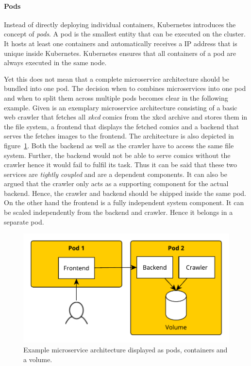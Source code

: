\paragraph{Pods}%
\label{par:Pods}
Instead of directly deploying individual containers, Kubernetes introduces the
concept of \textit{pods}. A pod is the smallest entity that can be executed on
the cluster. It hosts at least one containers and automatically receives a
\ac{IP} address that is unique inside Kubernetes. Kubernetes ensures that all
containers of a pod are always executed in the same node.

Yet this does not mean that a complete microservice architecture should be
bundled into one pod. The decision when to combines microservices into one pod
and when to split them across multiple pods becomes clear in the following
example. Given is an exemplary microservice architecture consisting of a basic
web crawler that fetches all \textit{xkcd} comics from the xkcd archive and
stores them in the file system, a frontend that displays the fetched comics and
a backend that serves the fetches images to the frontend. The architecture is
also depicted in figure~\ref{fig:pods_example}. Both the backend as well as the
crawler have to access the same file system. Further, the backend would not be
able to serve comics without the crawler hence it would fail to fulfil its
task. Thus it can be said that these two services are \textit{tightly coupled}
and are a dependent components. It can also be argued that the crawler only
acts as a supporting component for the actual backend. Hence, the crawler and
backend should be shipped inside the same pod. On the other hand the frontend
is a fully independent system component. It can be scaled independently from
the backend and crawler. Hence it belongs in a separate pod. 

\begin{figure}[H]
\begin{center}
  \includegraphics[scale=0.7]{images/figures/pod_example.pdf}
\end{center}
\caption{Example microservice architecture displayed as pods, containers and a volume.}%
\label{fig:pods_example}
\end{figure}

